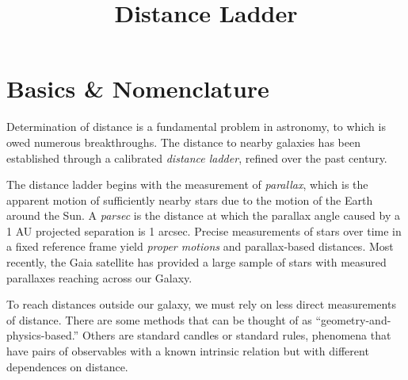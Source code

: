 \title{\bf Distance Ladder}

\section{Basics \& Nomenclature}

Determination of distance is a fundamental problem in astronomy, to
which is owed numerous breakthroughs. The distance to nearby galaxies
has been established through a calibrated {\it distance ladder},
refined over the past century.

The distance ladder begins with the measurement of {\it parallax},
which is the apparent motion of sufficiently nearby stars due to the
motion of the Earth around the Sun. A {\it parsec} is the distance at
which the parallax angle caused by a 1 AU projected separation is 1
arcsec.  Precise measurements of stars over time in a fixed reference
frame yield {\it proper motions} and parallax-based distances. Most
recently, the Gaia satellite has provided a large sample of stars with
measured parallaxes reaching across our Galaxy.

To reach distances outside our galaxy, we must rely on less direct
measurements of distance. There are some methods that can be thought
of as ``geometry-and-physics-based.'' Others are standard candles or
standard rules, phenomena that have pairs of observables with a known
intrinsic relation but with different dependences on distance.

